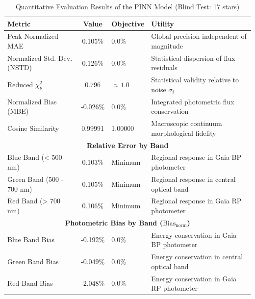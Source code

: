 
\begin{table}[htpb]
\centering
\caption{Quantitative Evaluation Results of the PINN Model (Blind Test: 17 stars)}
\label{tab:pinn_evaluation}
\begin{tabular}{lcll}
\hline
\textbf{Metric} & \textbf{Value} & \textbf{Objective} & \textbf{Utility} \\
\hline
Peak-Normalized MAE & 0.105\% & 0.0\% & Global precision independent of magnitude \\
Normalized Std. Dev. (NSTD) & 0.126\% & 0.0\% & Statistical dispersion of flux residuals \\
Reduced $\chi^2_\nu$ & 0.796 & $\approx 1.0$ & Statistical validity relative to noise $\sigma_i$ \\
Normalized Bias (MBE) & -0.026\% & 0.0\% & Integrated photometric flux conservation \\
Cosine Similarity & 0.99991 & 1.00000 & Macroscopic continuum morphological fidelity \\
\hline
\multicolumn{4}{c}{\textbf{Relative Error by Band}} \\
\hline
Blue Band (< 500 nm) & 0.103\% & Minimum & Regional response in Gaia BP photometer \\
Green Band (500 - 700 nm) & 0.105\% & Minimum & Regional response in central optical band \\
Red Band (> 700 nm) & 0.106\% & Minimum & Regional response in Gaia RP photometer \\
\hline
\multicolumn{4}{c}{\textbf{Photometric Bias by Band ($\text{Bias}_{\text{norm}}$)}} \\
\hline
Blue Band Bias & -0.192\% & 0.0\% & Energy conservation in Gaia BP photometer \\
Green Band Bias & -0.049\% & 0.0\% & Energy conservation in central optical band \\
Red Band Bias & -2.048\% & 0.0\% & Energy conservation in Gaia RP photometer \\
\hline
\end{tabular}
\end{table}
